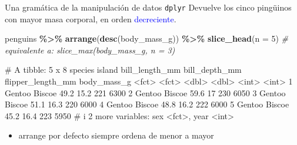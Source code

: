 \documentclass[
  ignorenonframetext,
  aspectratio=169]{beamer}
\newenvironment{Shaded}{\begin{snugshade}}{\end{snugshade}}
\newcommand{\AttributeTok}[1]{\textcolor[rgb]{0.13,0.29,0.53}{#1}}
\newcommand{\CommentTok}[1]{\textcolor[rgb]{0.56,0.35,0.01}{\textit{#1}}}
\newcommand{\DecValTok}[1]{\textcolor[rgb]{0.00,0.00,0.81}{#1}}
\newcommand{\FunctionTok}[1]{\textcolor[rgb]{0.13,0.29,0.53}{\textbf{#1}}}
\newcommand{\NormalTok}[1]{#1}
\newcommand{\SpecialCharTok}[1]{\textcolor[rgb]{0.81,0.36,0.00}{\textbf{#1}}}
\providecommand{\tightlist}{%
  \setlength{\itemsep}{0pt}\setlength{\parskip}{0pt}}
\let\oldverbatim\verbatim
\let\endoldverbatim\endverbatim
\renewenvironment{verbatim}{\tiny\oldverbatim}{\endoldverbatim}
\newcommand\blue[1]{\textcolor{blue}{#1}}
\begin{document}
\begin{frame}[fragile]{Una gramática de la manipulación de datos
\texttt{dplyr}}
\label{una-gramuxe1tica-de-la-manipulaciuxf3n-de-datos-dplyr-5}
Devuelve los cinco pingüinos con mayor masa corporal, en orden
\blue{decreciente}.

\begin{Shaded}
\begin{Highlighting}[]
\NormalTok{penguins }\SpecialCharTok{\%\textgreater{}\%} 
  \FunctionTok{arrange}\NormalTok{(}\FunctionTok{desc}\NormalTok{(body\_mass\_g)) }\SpecialCharTok{\%\textgreater{}\%} 
  \FunctionTok{slice\_head}\NormalTok{(}\AttributeTok{n =} \DecValTok{5}\NormalTok{) }\CommentTok{\# equivalente a: slice\_max(body\_mass\_g, n = 3)}
\end{Highlighting}
\end{Shaded}

\begin{verbatim}
# A tibble: 5 x 8
  species island bill_length_mm bill_depth_mm flipper_length_mm body_mass_g
  <fct>   <fct>           <dbl>         <dbl>             <int>       <int>
1 Gentoo  Biscoe           49.2          15.2               221        6300
2 Gentoo  Biscoe           59.6          17                 230        6050
3 Gentoo  Biscoe           51.1          16.3               220        6000
4 Gentoo  Biscoe           48.8          16.2               222        6000
5 Gentoo  Biscoe           45.2          16.4               223        5950
# i 2 more variables: sex <fct>, year <int>
\end{verbatim}

\begin{itemize}
\tightlist
\item
  arrange por defecto siempre ordena de menor a mayor
\end{itemize}
\end{frame}

\end{document}
